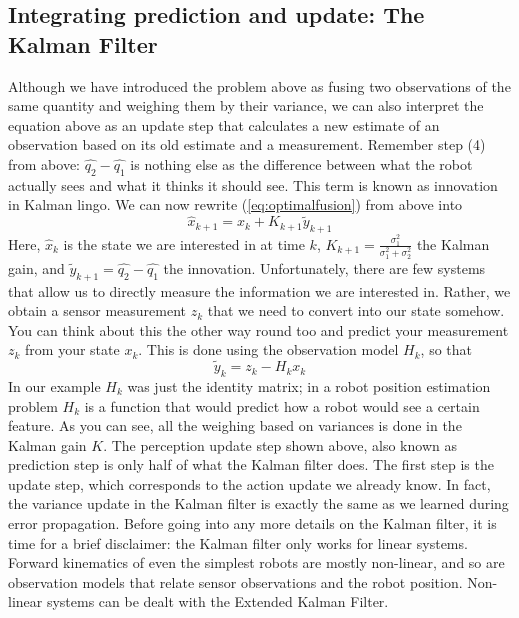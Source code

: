\subsection{Integrating prediction and update: The Kalman Filter}
Although we have introduced the problem above as fusing two observations of the same quantity and weighing them by their variance, we can also interpret the equation above as an update step that calculates a new estimate of an observation based on its old estimate and a measurement. Remember step (4) from above: $ \hat{q_2}-\hat{q_1}$ is nothing else as the difference between what the robot actually sees and what it thinks it should see. This term  is known as innovation in Kalman lingo. We can now 
rewrite (\ref{eq:optimalfusion}) from above into
\begin{equation}
\hat{x}_{k+1}=\hat{x}_k+K_{k+1}\tilde{y}_{k+1}
\end{equation}
Here, $ \hat{x}_k$ is the state we are interested in at time $ k$, $ K_{k+1}=\frac{\sigma_1^2}{\sigma_1^2+\sigma_2^2}$ the Kalman gain, and $ \tilde{y}_{k+1}=\hat{q_2}-\hat{q_1}$  the innovation. Unfortunately, there are few systems that allow us to directly measure the information we are interested in. Rather, we obtain a sensor measurement $ z_k$ that we need to convert into our state somehow. You can think about this the other way round too and predict your measurement $ z_k$ from your state $ x_k$. This is done using the observation model $ H_k$, so that
\begin{equation}
\tilde{y}_{k}=z_k-H_k x_k
\end{equation}
In our example $ H_k$ was just the identity matrix; in a robot position estimation problem $ H_k$ is a function that would predict how a robot would see a certain feature. As you can see, all the weighing based on variances is done in the Kalman gain $ K$.
The perception update step shown above, also known as prediction step is only half of what the Kalman filter does. The first step is the update step, which corresponds to the action update we already know. In fact, the variance update in the Kalman filter is exactly the same as we learned during error propagation. Before going into any more details on the Kalman filter, it is time for a brief disclaimer: the Kalman filter only works for linear systems. Forward kinematics of even the simplest robots are mostly non-linear, and so are observation models that relate sensor observations and the robot position. Non-linear systems can be dealt with the Extended Kalman Filter.

